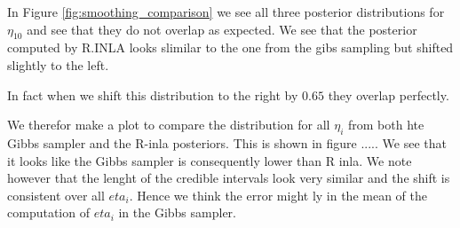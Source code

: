 In Figure \ref{fig:smoothing_comparison} we see all three posterior distributions for $\eta_{10}$ and see that they do not overlap as expected. We see that the posterior computed by R.INLA looks slimilar to the one from the gibs sampling but shifted slightly to the left. 

In fact when we shift this distribution to the right by $0.65$ they overlap perfectly. 

We therefor make a plot to compare the distribution for all $\eta_i$ from both hte Gibbs sampler and the R-inla posteriors. This is shown in figure ..... We see that it looks like the Gibbs sampler is consequently lower than R inla. We note however that the lenght of the credible intervals look very similar and the shift is consistent over all $eta_i$. Hence we think the error might ly in the mean of the computation of $eta_i$ in the Gibbs sampler.  